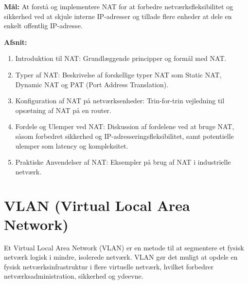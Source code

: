 \textbf{Mål:} At forstå og implementere NAT for at forbedre netværksfleksibilitet og sikkerhed ved at skjule interne IP-adresser og tillade flere enheder at dele en enkelt offentlig IP-adresse.

\noindent\textbf{Afsnit:}
\begin{enumerate}
	\item Introduktion til NAT: Grundlæggende principper og formål med NAT.
	\item Typer af NAT: Beskrivelse af forskellige typer NAT som Static NAT, Dynamic NAT og PAT (Port Address Translation).
	\item Konfiguration af NAT på netværksenheder: Trin-for-trin vejledning til opsætning af NAT på en router.
	\item Fordele og Ulemper ved NAT: Diskussion af fordelene ved at bruge NAT, såsom forbedret sikkerhed og IP-adresseringsfleksibilitet, samt potentielle ulemper som latency og kompleksitet.
	\item Praktiske Anvendelser af NAT: Eksempler på brug af NAT i industrielle netværk.
\end{enumerate}

\section{VLAN (Virtual Local Area Network)}
Et Virtual Local Area Network (VLAN) er en metode til at segmentere et fysisk netværk logisk i mindre, isolerede netværk. VLAN gør det muligt at opdele en fysisk netværksinfrastruktur i flere virtuelle netværk, hvilket forbedrer netværksadministration, sikkerhed og ydeevne.

